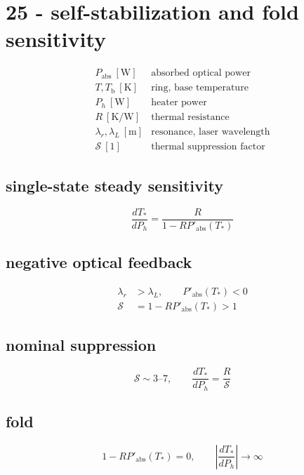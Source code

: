 \section*{25 - self-stabilization and fold sensitivity}

\[
\begin{array}{ll}P_{\mathrm{abs}}\ [\mathrm W]&\text{absorbed optical power}\\[0.6em]T,T_{\mathrm b}\ [\mathrm K]&\text{ring, base temperature}\\[0.6em]P_h\ [\mathrm W]&\text{heater power}\\[0.6em]R\ [\mathrm{K/W}]&\text{thermal resistance}\\[0.6em]\lambda_r,\lambda_L\ [\mathrm m]&\text{resonance, laser wavelength}\\[0.6em]\mathcal S\ [1]&\text{thermal suppression factor}\end{array}
\]

\subsection*{single-state steady sensitivity}
\[
\displaystyle \frac{dT_*}{dP_h}=\frac R{1-RP'_{\mathrm{abs}}(T_*)}
\]

\subsection*{negative optical feedback}
\[
\displaystyle \begin{aligned}\lambda_r&>\lambda_L,\qquad P'_{\mathrm{abs}}(T_*)<0\\\mathcal S&=1-RP'_{\mathrm{abs}}(T_*)>1\end{aligned}
\]

\subsection*{nominal suppression}
\[
\displaystyle \mathcal S\sim3\text{--}7,\qquad\frac{dT_*}{dP_h}=\frac R{\mathcal S}
\]

\subsection*{fold}
\[
\displaystyle 1-RP'_{\mathrm{abs}}(T_*)=0,\qquad\left|\frac{dT_*}{dP_h}\right|\to\infty
\]
